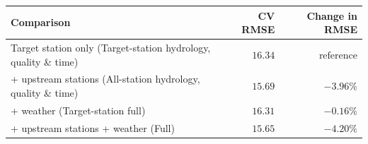 \begin{tabularx}{\textwidth}{@{}Xrr@{}}
\toprule
\textbf{Comparison} & \textbf{CV RMSE} & \textbf{Change in RMSE} \\
\midrule
Target station only (Target-station hydrology, quality \& time) & $16.34$ & $\text{reference}$ \\
\addlinespace
+ upstream stations (All-station hydrology, quality \& time) & $15.69$ & $-3.96\%$ \\
\addlinespace
+ weather (Target-station full) & $16.31$ & $-0.16\%$ \\
\addlinespace
+ upstream stations + weather (Full) & $15.65$ & $-4.20\%$ \\
\bottomrule
\end{tabularx}
